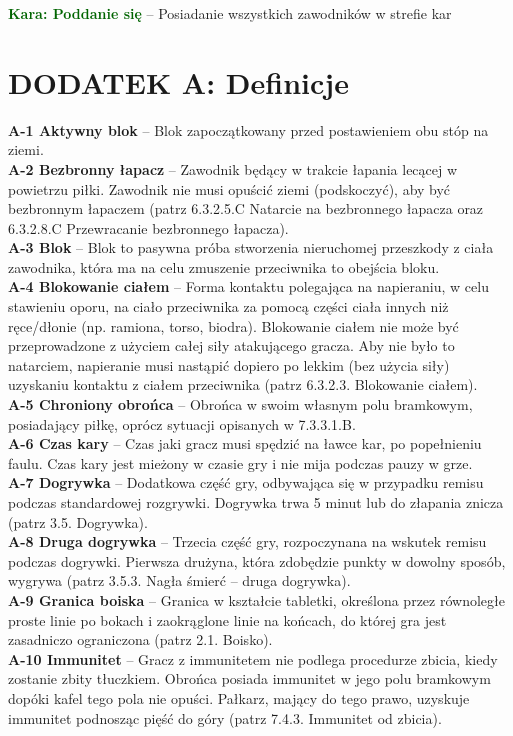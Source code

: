 \documentclass[11pt,a4paper]{article}
\newcommand{\psection}[1]{
  \section*{#1}
  \addcontentsline{toc}{section}{#1}
}
\newcommand\penaltyd[2]{\bgroup\textcolor{darkgreen}{\textbf{Kara: #1}} -- #2}
\begin{document}
\penaltyd{Poddanie się}{Posiadanie wszystkich zawodników w strefie kar}

%
%
%
%
%
%

\newpage

\psection{DODATEK A: Definicje}
\textbf{A-1 Aktywny blok} – Blok zapoczątkowany przed postawieniem obu stóp na ziemi. \\
\textbf{A-2 Bezbronny łapacz} – Zawodnik będący w trakcie łapania lecącej w powietrzu piłki. Zawodnik nie musi opuścić ziemi (podskoczyć), aby być bezbronnym łapaczem (patrz 6.3.2.5.C Natarcie na bezbronnego łapacza oraz 6.3.2.8.C Przewracanie bezbronnego łapacza).\\
\textbf{A-3 Blok} – Blok to pasywna próba stworzenia nieruchomej przeszkody z ciała zawodnika, która ma na celu zmuszenie przeciwnika to obejścia bloku.\\
\textbf{A-4 Blokowanie ciałem} – Forma kontaktu polegająca na napieraniu, w celu stawieniu oporu, na ciało przeciwnika za pomocą części ciała innych niż ręce/dłonie (np. ramiona, torso, biodra). Blokowanie ciałem nie może być przeprowadzone z użyciem całej siły atakującego gracza. Aby nie było to natarciem, napieranie musi nastąpić dopiero po lekkim (bez użycia siły) uzyskaniu kontaktu z ciałem przeciwnika (patrz 6.3.2.3. Blokowanie ciałem).\\
\textbf{A-5 Chroniony obrońca} – Obrońca w swoim własnym polu bramkowym, posiadający piłkę, oprócz sytuacji opisanych w 7.3.3.1.B.\\
\textbf{A-6 Czas kary} – Czas jaki gracz musi spędzić na ławce kar, po popełnieniu faulu. Czas kary jest mieżony w czasie gry i nie mija podczas pauzy w grze.\\
\textbf{A-7 Dogrywka} – Dodatkowa część gry, odbywająca się w przypadku remisu podczas standardowej rozgrywki. Dogrywka trwa 5 minut lub do złapania znicza (patrz 3.5. Dogrywka).\\
\textbf{A-8 Druga dogrywka} – Trzecia część gry, rozpoczynana na wskutek remisu podczas dogrywki. Pierwsza drużyna, która zdobędzie punkty w dowolny sposób, wygrywa (patrz 3.5.3. Nagła śmierć – druga dogrywka).\\
\textbf{A-9 Granica boiska} – Granica w kształcie tabletki, określona przez równoległe proste linie po bokach i zaokrąglone linie na końcach, do której gra jest zasadniczo ograniczona (patrz 2.1. Boisko).\\
\textbf{A-10 Immunitet} – Gracz z immunitetem nie podlega procedurze zbicia, kiedy zostanie zbity tłuczkiem. Obrońca posiada immunitet w jego polu bramkowym dopóki kafel tego pola nie opuści. Pałkarz, mający do tego prawo, uzyskuje immunitet podnosząc pięść do góry (patrz 7.4.3. Immunitet od zbicia).\\
\end{document}
